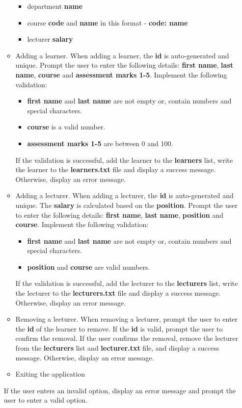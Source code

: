 \documentclass{article}
\begin{document}
\begin{itemize}
\begin{itemize}
\begin{itemize}
            \item department \textbf{name}
            \item course \textbf{code} and \textbf{name} in this format - \textbf{code: name}
            \item lecturer \textbf{salary}
        \end{itemize}
        \item Adding a learner. When adding a learner, the \textbf{id} is auto-generated and unique. Prompt the user to enter the following details: \textbf{first name}, \textbf{last name}, \textbf{course} and \textbf{assessment marks 1-5}. Implement the following validation:
        \begin{itemize}
            \item \textbf{first name} and \textbf{last name} are not empty or, contain numbers and special characters.
            \item \textbf{course} is a valid number.
            \item \textbf{assessment marks 1-5} are between 0 and 100.
        \end{itemize} 
        If the validation is successful, add the learner to the \textbf{learners} list, write the learner to the \textbf{learners.txt} file and display a success message. Otherwise, display an error message.                          
        \item Adding a lecturer. When adding a lecturer, the \textbf{id} is auto-generated and unique. The \textbf{salary} is calculated based on the \textbf{position}. Prompt the user to enter the following details: \textbf{first name}, \textbf{last name}, \textbf{position} and \textbf{course}. Implement the following validation:
        \begin{itemize}
            \item \textbf{first name} and \textbf{last name} are not empty or, contain numbers and special characters.
            \item \textbf{position} and \textbf{course} are valid numbers.
        \end{itemize}
        If the validation is successful, add the lecturer to the \textbf{lecturers} list, write the lecturer to the \textbf{lecturers.txt} file and display a success message. Otherwise, display an error message.
        \item Removing a lecturer. When removing a lecturer, prompt the user to enter the \textbf{id} of the learner to remove. If the \textbf{id} is valid, prompt the user to confirm the removal. If the user confirms the removal, remove the lecturer from the \textbf{lecturers} list and \textbf{lecturer.txt} file, and display a success message. Otherwise, display an error message.
        \item Exiting the application
    \end{itemize} 
    If the user enters an invalid option, display an error message and prompt the user to enter a valid option.
\end{itemize}
\end{document}
